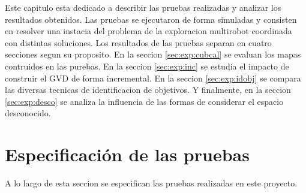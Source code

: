 






Este capitulo esta dedicado a describir las pruebas realizadas y analizar los
resultados obtenidos. Las pruebas se ejecutaron de forma simuladas y consisten
en resolver una instacia del problema de la exploracion multirobot coordinada
con distintas soluciones.
Los resultados de las pruebas separan en cuatro secciones segun su proposito.
En la seccion \ref{sec:exp:cubcal} se evaluan los mapas contruidos en las
purebas. En la seccion \ref{sec:exp:inc} se estudia el impacto de construir el
GVD de forma incremental. En la seccion \ref{sec:exp:idobj} se compara las
diversas tecnicas de identificacion de objetivos. Y finalmente, en la seccion
\ref{sec:exp:desco} se analiza la influencia de las formas de considerar el
espacio desconocido. 

\section{Especificación de las pruebas}

A lo largo de esta seccion se especifican las pruebas realizadas en este
proyecto.


